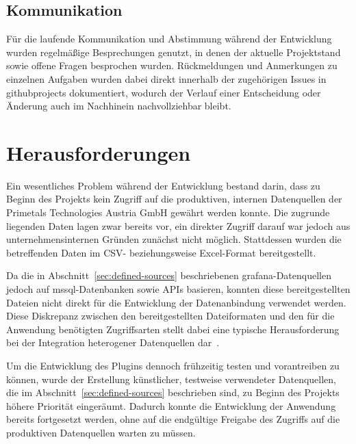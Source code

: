 \subsection{Kommunikation}
\label{subsec:communication}

Für die laufende Kommunikation und Abstimmung während der Entwicklung wurden regelmäßige
Besprechungen genutzt, in denen der aktuelle Projektstand sowie offene Fragen besprochen
wurden. Rückmeldungen und Anmerkungen zu einzelnen Aufgaben wurden dabei direkt innerhalb
der zugehörigen Issues in \gls{githubprojects} dokumentiert, wodurch der Verlauf einer
Entscheidung oder Änderung auch im Nachhinein nachvollziehbar bleibt.

\section{Herausforderungen}
\label{sec:project-problems}

Ein wesentliches Problem während der Entwicklung bestand darin, dass zu Beginn des
Projekts kein Zugriff auf die produktiven, internen Datenquellen der Primetals
Technologies Austria GmbH gewährt werden konnte. Die zugrunde liegenden Daten lagen zwar
bereits vor, ein direkter Zugriff darauf war jedoch aus unternehmensinternen Gründen
zunächst nicht möglich. Stattdessen wurden die betreffenden Daten im CSV- beziehungsweise
Excel-Format bereitgestellt.

Da die in Abschnitt~\ref{sec:defined-sources} beschriebenen \gls{grafana}-Datenquellen
jedoch auf \gls{mssql}-Datenbanken sowie APIs basieren, konnten diese bereitgestellten
Dateien nicht direkt für die Entwicklung der Datenanbindung verwendet werden. Diese
Diskrepanz zwischen den bereitgestellten Dateiformaten und den für die Anwendung
benötigten Zugriffsarten stellt dabei eine typische Herausforderung bei der Integration
heterogener Datenquellen dar~\cite{Putrama2024}.

Um die Entwicklung des Plugins dennoch frühzeitig testen und vorantreiben zu können, wurde
der Erstellung künstlicher, testweise verwendeter Datenquellen, die im Abschnitt~\ref{sec:defined-sources} 
beschrieben sind, zu Beginn des Projekts höhere Priorität eingeräumt. Dadurch
konnte die Entwicklung der Anwendung bereits fortgesetzt werden, ohne auf die
endgültige Freigabe des Zugriffs auf die produktiven Datenquellen warten zu müssen.